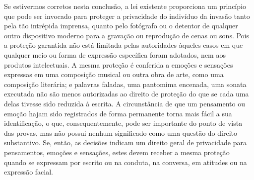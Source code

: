 Se estivermos corretos nesta conclusão, a lei existente proporciona um
princípio que pode ser invocado para proteger a privacidade do indivíduo
da invasão tanto pela tão intrépida imprensa, quanto pelo fotógrafo ou o
detentor de qualquer outro dispositivo moderno para a gravação ou
reprodução de cenas ou sons. Pois a proteção garantida não está limitada
pelas autoridades àqueles casos em que qualquer meio ou forma de
expressão específica foram adotados, nem aos produtos intelectuais. A
mesma proteção é conferida a emoções e sensações expressas em uma
composição musical ou outra obra de arte, como uma composição literária;
e palavras faladas, uma pantomima encenada, uma sonata executada não são
menos autorizadas ao direito de proteção do que se cada uma delas
tivesse sido reduzida à escrita. A circunstância de que um pensamento ou
emoção hajam sido registrados de forma permanente torna mais fácil a sua
identificação, o que, consequentemente, pode ser importante do ponto de
vista das provas, mas não possui nenhum significado como uma questão do
direito substantivo. Se, então, as decisões indicam um direito geral de
privacidade para pensamentos, emoções e sensações, estes devem receber a
mesma proteção quando se expressam por escrito ou na conduta, na
conversa, em atitudes ou na expressão facial.

